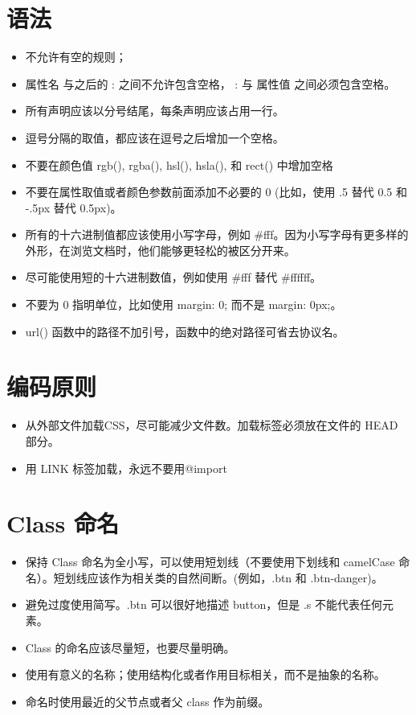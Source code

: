 \documentclass[]{report}
\providecommand{\tightlist}{%
  \setlength{\itemsep}{0pt}\setlength{\parskip}{0pt}}
\begin{document}
\hypertarget{ux8bedux6cd5}{%
\section{语法}\label{ux8bedux6cd5}}

\begin{itemize}
\tightlist
\item
  不允许有空的规则；
\item
  属性名 与之后的 : 之间不允许包含空格， : 与 属性值 之间必须包含空格。
\item
  所有声明应该以分号结尾，每条声明应该占用一行。
\item
  逗号分隔的取值，都应该在逗号之后增加一个空格。
\item
  不要在颜色值 rgb(), rgba(), hsl(), hsla(), 和 rect() 中增加空格
\item
  不要在属性取值或者颜色参数前面添加不必要的 0 (比如，使用 .5 替代 0.5
  和 -.5px 替代 0.5px)。
\item
  所有的十六进制值都应该使用小写字母，例如
  \#fff。因为小写字母有更多样的外形，在浏览文档时，他们能够更轻松的被区分开来。
\item
  尽可能使用短的十六进制数值，例如使用 \#fff 替代 \#ffffff。
\item
  不要为 0 指明单位，比如使用 margin: 0; 而不是 margin: 0px;。
\item
  url() 函数中的路径不加引号，函数中的绝对路径可省去协议名。
\end{itemize}

\hypertarget{ux7f16ux7801ux539fux5219}{%
\section{编码原则}\label{ux7f16ux7801ux539fux5219}}

\begin{itemize}
\tightlist
\item
  从外部文件加载CSS，尽可能减少文件数。加载标签必须放在文件的 HEAD
  部分。
\item
  用 LINK 标签加载，永远不要用@import
\end{itemize}

\hypertarget{class-ux547dux540d}{%
\section{Class 命名}\label{class-ux547dux540d}}

\begin{itemize}
\tightlist
\item
  保持 Class 命名为全小写，可以使用短划线（不要使用下划线和 camelCase
  命名）。短划线应该作为相关类的自然间断。(例如，.btn 和 .btn-danger)。
\item
  避免过度使用简写。.btn 可以很好地描述 button，但是 .s
  不能代表任何元素。
\item
  Class 的命名应该尽量短，也要尽量明确。
\item
  使用有意义的名称；使用结构化或者作用目标相关，而不是抽象的名称。
\item
  命名时使用最近的父节点或者父 class 作为前缀。
\end{itemize}
\end{document}
